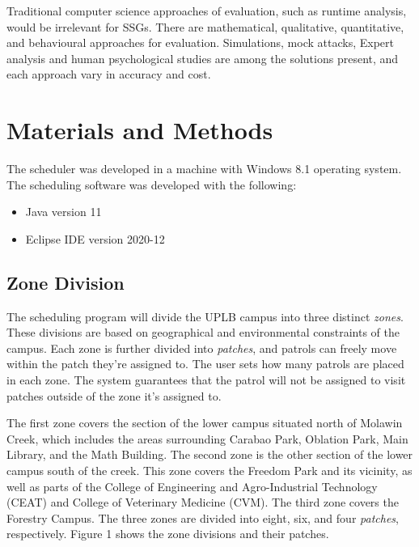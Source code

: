 \documentclass[journal]{./IEEE/IEEEtran}
\begin{document}
Traditional computer science approaches of evaluation, such as runtime analysis, would be irrelevant for SSGs. There are mathematical, qualitative, quantitative, and behavioural approaches for evaluation. Simulations, mock attacks, Expert analysis and human psychological studies are among the solutions present, and each approach vary in accuracy and cost.\cite{taylor2010framework}

\section{Materials and Methods}
The scheduler was developed in a machine with Windows 8.1 operating system. The scheduling software was developed with the following:

\begin{itemize}
\item{Java version 11} 
\item{Eclipse IDE version 2020-12}
\end{itemize}


\subsection{Zone Division}

The scheduling program will divide the UPLB campus into three distinct \textit{zones}. These divisions are based on geographical and environmental constraints of the campus. Each zone is further divided into \textit{patches}, and patrols can freely move within the patch they're assigned to. The user sets how many patrols are placed in each zone. The system guarantees that the patrol will not be assigned to visit patches outside of the zone it's assigned to.


The first zone covers the section of the lower campus situated north of Molawin Creek, which includes the areas surrounding Carabao Park, Oblation Park, Main Library, and the Math Building. The second zone is the other section of the lower campus south of the creek. This zone covers the Freedom Park and its vicinity, as well as parts of the College of Engineering and Agro-Industrial Technology (CEAT) and College of Veterinary Medicine (CVM). The third zone covers the Forestry Campus. The three zones are divided into eight, six, and four \textit{patches}, respectively. Figure 1 shows the zone divisions and their patches. 
\end{document}

